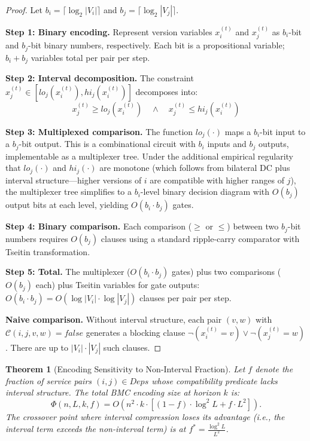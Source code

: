 \documentclass[10pt,twocolumn]{article}
\newtheorem{theorem}{Theorem}[section]
\begin{document}
\begin{proof}
Let $b_i = \lceil \log_2 |V_i| \rceil$ and $b_j = \lceil \log_2 |V_j| \rceil$.

\textbf{Step 1: Binary encoding.} Represent version variables $x_i^{(t)}$ and $x_j^{(t)}$ as $b_i$-bit and $b_j$-bit binary numbers, respectively. Each bit is a propositional variable; $b_i + b_j$ variables total per pair per step.

\textbf{Step 2: Interval decomposition.} The constraint $x_j^{(t)} \in [\mathit{lo}_j(x_i^{(t)}), \mathit{hi}_j(x_i^{(t)})]$ decomposes into:
\[
  x_j^{(t)} \geq \mathit{lo}_j(x_i^{(t)}) \quad \wedge \quad x_j^{(t)} \leq \mathit{hi}_j(x_i^{(t)})
\]

\textbf{Step 3: Multiplexed comparison.} The function $\mathit{lo}_j(\cdot)$ maps a $b_i$-bit input to a $b_j$-bit output. This is a combinational circuit with $b_i$ inputs and $b_j$ outputs, implementable as a multiplexer tree. Under the additional empirical regularity that $\mathit{lo}_j(\cdot)$ and $\mathit{hi}_j(\cdot)$ are monotone (which follows from bilateral DC plus interval structure---higher versions of $i$ are compatible with higher ranges of $j$), the multiplexer tree simplifies to a $b_i$-level binary decision diagram with $O(b_j)$ output bits at each level, yielding $O(b_i \cdot b_j)$ gates.

\textbf{Step 4: Binary comparison.} Each comparison ($\geq$ or $\leq$) between two $b_j$-bit numbers requires $O(b_j)$ clauses using a standard ripple-carry comparator with Tseitin transformation.

\textbf{Step 5: Total.} The multiplexer ($O(b_i \cdot b_j)$ gates) plus two comparisons ($O(b_j)$ each) plus Tseitin variables for gate outputs: $O(b_i \cdot b_j) = O(\log|V_i| \cdot \log|V_j|)$ clauses per pair per step.

\textbf{Naive comparison.} Without interval structure, each pair $(v,w)$ with $\mathcal{C}(i,j,v,w) = \mathit{false}$ generates a blocking clause $\neg(x_i^{(t)} = v) \vee \neg(x_j^{(t)} = w)$. There are up to $|V_i| \cdot |V_j|$ such clauses.
\end{proof}

\begin{theorem}[Encoding Sensitivity to Non-Interval Fraction]
\label{thm:sensitivity}
Let $f$ denote the fraction of service pairs $(i,j) \in \mathit{Deps}$ whose compatibility predicate lacks interval structure. The total BMC encoding size at horizon $k$ is:
\[
  \Phi(n, L, k, f) = O\!\left(n^2 \cdot k \cdot \left[(1-f) \cdot \log^2 L + f \cdot L^2\right]\right).
\]
The crossover point where interval compression loses its advantage (i.e., the interval term exceeds the non-interval term) is at $f^* = \frac{\log^2 L}{L^2}$.
\end{theorem}
\end{document}
